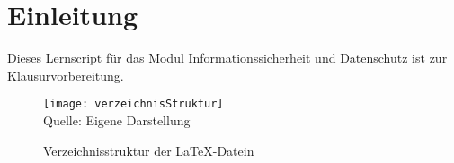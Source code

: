 \section{Einleitung}
Dieses Lernscript für das Modul Informationssicherheit und Datenschutz ist zur Klausurvorbereitung.



\begin{figure}[H]
\caption{Verzeichnisstruktur der \LaTeX{}-Datein}\label{fig:verzeichnisStruktur}
\texttt{[image: verzeichnisStruktur]}
\\
Quelle: Eigene Darstellung
\end{figure}
